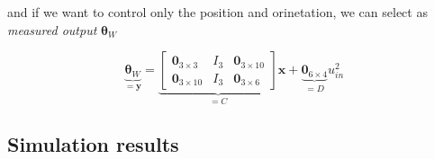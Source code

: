 \noindent and if we want to control only the position and orinetation, we can select as \textit{measured output} $\boldsymbol{\theta}_W$

\begin{equation}
	\underbrace{\boldsymbol{\theta}_W}_{=\mathbf{y}} = 
	\underbrace{\begin{bmatrix}
		\mathbf{0}_{3\times 3}  & I_3 & \mathbf{0}_{3\times 10} \\
		\mathbf{0}_{3\times 10} & I_3 & \mathbf{0}_{3\times 6}
	\end{bmatrix}}_{=C} \mathbf{x} + \underbrace{\mathbf{0}_{6\times 4}}_{=D}u_{in}^2
\end{equation}

\subsection{Simulation results}